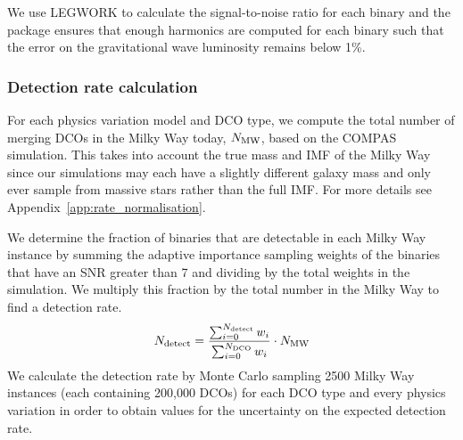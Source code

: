 We use LEGWORK to calculate the signal-to-noise ratio for each binary and the package ensures that enough harmonics are computed for each binary such that the error on the gravitational wave luminosity remains below 1\%.

\subsubsection{Detection rate calculation}
For each physics variation model and DCO type, we compute the total number of merging DCOs in the Milky Way today, $N_{\rm MW}$, based on the COMPAS simulation. This takes into account the true mass and IMF of the Milky Way since our simulations may each have a slightly different galaxy mass and only ever sample from massive stars rather than the full IMF. For more details see Appendix~\ref{app:rate_normalisation}.

We determine the fraction of binaries that are detectable in each Milky Way instance by summing the adaptive importance sampling weights of the binaries that have an SNR greater than 7 and dividing by the total weights in the simulation. We multiply this fraction by the total number in the Milky Way to find a detection rate.
\begin{equation}
    N_{\rm detect} = \frac{\sum_{i = 0}^{N_{\rm detect}} w_i}{\sum_{i = 0}^{N_{\rm DCO}} w_i} \cdot N_{\rm MW}
\end{equation}
We calculate the detection rate by Monte Carlo sampling 2500 Milky Way instances (each containing 200,000 DCOs) for each DCO type and every physics variation in order to obtain values for the uncertainty on the expected detection rate.